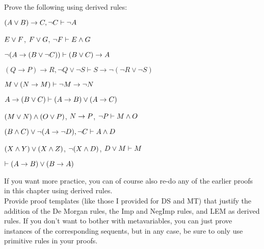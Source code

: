 \problempart
Prove the following using derived rules:
\begin{earg}
\item $(A \vee B) \rightarrow C , \neg C \vdash \neg A$
\item $E\vee F$, $F\vee G$, $\neg F \vdash E \wedge G$
\item $\neg (A \rightarrow (B \vee \neg C)) \vdash (B \vee C) \rightarrow A$
\item $(Q \rightarrow P) \rightarrow R, \lnot Q \lor \lnot S \vdash S \rightarrow \lnot (\lnot R \lor \lnot S)$
\item $M\vee(N\rightarrow M)  \vdash  \neg M \rightarrow \neg N$
\item $A \rightarrow (B \vee C) \vdash (A \rightarrow B) \vee (A \rightarrow C)$
\item $(M \vee N) \wedge (O \vee P)$, $N \rightarrow P$, $\neg P  \vdash  M\wedge O$
\item $(B \wedge C) \vee \neg (A \rightarrow \neg D), \neg C \vdash A \wedge D$
\item $(X\wedge Y)\vee(X\wedge Z)$, $\neg(X\wedge D)$, $D\vee M  \vdash  M$
\item $\vdash (A \rightarrow B) \vee (B \rightarrow A)$

\end{earg}
If you want more practice, you can of course also re-do any of the earlier proofs in this chapter using derived rules. \\

\problempart
Provide proof templates (like those I provided for DS and MT) that justify the addition of the De Morgan rules, the Imp and NegImp rules, and LEM as derived rules. If you don't want to bother with metavariables, you can just prove instances of the corresponding sequents, but  in any case, be sure to only use primitive rules in your proofs.